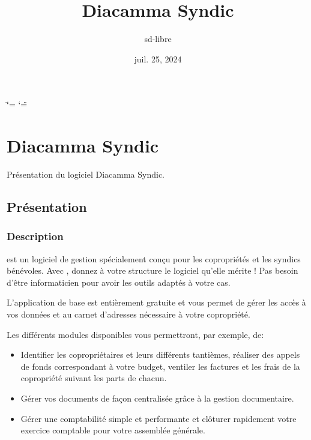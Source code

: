 \documentclass[a4paper,10pt,oneside,french]{sphinxmanual}
\title{Diacamma Syndic}
\date{juil. 25, 2024}
\author{sd-libre}
\begin{document}
\ifdefined\shorthandoff
  \ifnum\catcode`\=\string=\active\shorthandoff{=}\fi
  \ifnum\catcode`\"=\active{}\fi
\fi

\pagestyle{empty}
\sphinxmaketitle
\pagestyle{plain}
\sphinxtableofcontents
\pagestyle{normal}
\label{\detokenize{index::doc}}


\sphinxstepscope


\chapter{Diacamma Syndic}
\label{\detokenize{syndic/index:diacamma-syndic}}\label{\detokenize{syndic/index::doc}}
\sphinxAtStartPar
Présentation du logiciel Diacamma Syndic.

\sphinxstepscope


\section{Présentation}
\label{\detokenize{syndic/presentation:presentation}}\label{\detokenize{syndic/presentation::doc}}

\subsection{Description}
\label{\detokenize{syndic/presentation:description}}
\sphinxAtStartPar
{} est un logiciel de gestion spécialement conçu pour les copropriétés et les syndics bénévoles.
Avec , donnez à votre structure le logiciel qu’elle mérite ! Pas besoin d’être informaticien pour avoir les outils adaptés à votre cas.

\sphinxAtStartPar
L’application de base est entièrement gratuite et vous permet de gérer les accès à vos données et au carnet d’adresses nécessaire à votre copropriété.

\sphinxAtStartPar
Les différents modules disponibles vous permettront, par exemple, de:
\begin{itemize}
\item {} 
\sphinxAtStartPar
Identifier les copropriétaires et leurs différents tantièmes, réaliser des appels de fonds correspondant à votre budget, ventiler les factures et les frais de la copropriété suivant les parts de chacun.

\item {} 
\sphinxAtStartPar
Gérer vos documents de façon centralisée grâce à la gestion documentaire.

\item {} 
\sphinxAtStartPar
Gérer une comptabilité simple et performante et clôturer rapidement votre exercice comptable pour votre assemblée générale.

\end{itemize}
\end{document}

